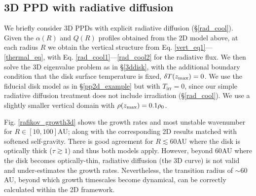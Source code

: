 \subsection{3D PPD with radiative diffusion}
We briefly consider 3D PPDs with explicit radiative diffusion
(\S\ref{rad_cool}). 
Given the $\alpha(R)$ and $Q(R)$ profiles obtained
from the 2D model above, at each radius $R$ we obtain the vertical
structure from Eq. \ref{vert_eq1}---\ref{thermal_eq}, with 
Eq. \ref{rad_cool1}---\ref{rad_cool2} for the radiative flux.
We then solve the 3D eigenvalue problem as in \S\ref{3ddisk}, with the
additional boundary condition that the disk surface temperature is
fixed, $\delta T(z_\mathrm{max}) = 0$. 
We use the fiducial disk model as in \S\ref{pp2d_example} but 
with $T_\mathrm{irr}=0$, since our simple radiative diffusion
treatment does not include irradiation (\S\ref{rad_cool}). %
We use a slightly smaller vertical
domain with $\rho(z_\mathrm{max})=0.1\rho_0$.  %

Fig. \ref{rafikov_growth3d} shows the growth rates and most unstable 
wavenumber for $R\in[10,100]$AU; along with the corresponding 2D 
results matched with softened self-gravity. There is good agreement for
$R\lesssim60$AU where the disk is optically thick ($\tau\gtrsim
1$) and thus both models apply. However, beyond $60$AU where the disk
becomes optically-thin, radiative diffusion (the 3D curve) is not
valid and under-estimates the growth rates. %
Nevertheless, the transition radius of  
$\sim60$AU, beyond which growth timescales become dynamical,    
can be correctly calculated within the 2D framework.  

